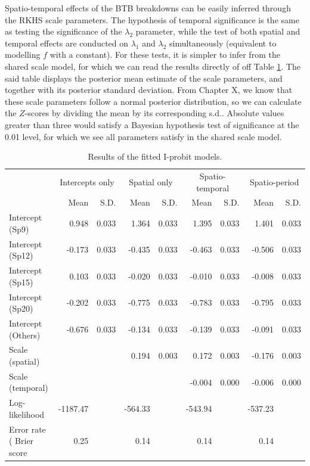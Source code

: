 \documentclass[a4paper,showframe,11pt]{report}\usepackage[]{graphicx}\usepackage[]{color}
\makeatletter
\newenvironment{kframe}{%
 \def\at@end@of@kframe{}%
 \ifinner\ifhmode%
  \def\at@end@of@kframe{\end{minipage}}%
  \begin{minipage}{\columnwidth}%
 \fi\fi%
 \def\FrameCommand##1{\hskip\@totalleftmargin \hskip-\fboxsep
 \colorbox{shadecolor}{##1}\hskip-\fboxsep
     \hskip-\linewidth \hskip-\@totalleftmargin \hskip\columnwidth}%
 \MakeFramed {\advance\hsize-\width
   \@totalleftmargin\z@ \linewidth\hsize
   \@setminipage}}%
 {\par\unskip\endMakeFramed%
 \at@end@of@kframe}
\makeatother
\begin{document}
Spatio-temporal effects of the BTB breakdowns can be easily inferred through the RKHS scale parameters.
The hypothesis of temporal significance is the same as testing the significance of the $\lambda_2$ parameter, while the test of both spatial and temporal effects are conducted on $\lambda_1$ and $\lambda_2$ simultaneously (equivalent to modelling $f$ with a constant).
For these tests, it is simpler to infer from the shared scale model, for which we can read the results directly of off Table \ref{tab:table.btb}.
The said table displays the posterior mean estimate of the scale parameters, and together with its posterior standard deviation.
From Chapter X, we know that these scale parameters follow a normal posterior distribution, so we can calculate the $Z$-scores by dividing the mean by its corresponding s.d..
Absolute values greater than three would satisfy a Bayesian hypothesis test of significance at the 0.01 level, for which we see all parameters satisfy in the shared scale model.

\begin{kframe}
\singlespacing\end{kframe}
\begin{landscape}\begin{table}

\caption{\label{tab:table.btb}Results of the fitted I-probit models.}
\centering
\begin{tabular}[t]{lrrrrrrrr}
\toprule
\multicolumn{1}{c}{ } & \multicolumn{2}{c}{Intercepts only} & \multicolumn{2}{c}{Spatial only} & \multicolumn{2}{c}{Spatio-temporal} & \multicolumn{2}{c}{Spatio-period} \\
\cmidrule(l{2pt}r{2pt}){2-3} \cmidrule(l{2pt}r{2pt}){4-5} \cmidrule(l{2pt}r{2pt}){6-7} \cmidrule(l{2pt}r{2pt}){8-9}
  & Mean & S.D. & Mean & S.D. & Mean & S.D. & Mean & S.D.\\
\midrule
Intercept (Sp9) & 0.948 & 0.033 & 1.364 & 0.033 & 1.395 & 0.033 & 1.401 & 0.033\\
Intercept (Sp12) & -0.173 & 0.033 & -0.435 & 0.033 & -0.463 & 0.033 & -0.506 & 0.033\\
Intercept (Sp15) & 0.103 & 0.033 & -0.020 & 0.033 & -0.010 & 0.033 & -0.008 & 0.033\\
Intercept (Sp20) & -0.202 & 0.033 & -0.775 & 0.033 & -0.783 & 0.033 & -0.795 & 0.033\\
Intercept (Others) & -0.676 & 0.033 & -0.134 & 0.033 & -0.139 & 0.033 & -0.091 & 0.033\\
Scale (spatial) &  &  & 0.194 & 0.003 & 0.172 & 0.003 & -0.176 & 0.003\\
Scale (temporal) &  &  &  &  & -0.004 & 0.000 & -0.006 & 0.000\\
Log-likelihood & -1187.47 &  & -564.33 &  & -543.94 &  & -537.23 & \\
Error rate (%
Brier score & 0.25 &  & 0.14 &  & 0.14 &  & 0.14 & \\
\bottomrule
\end{tabular}
\end{table}
\end{landscape}
\end{document}
